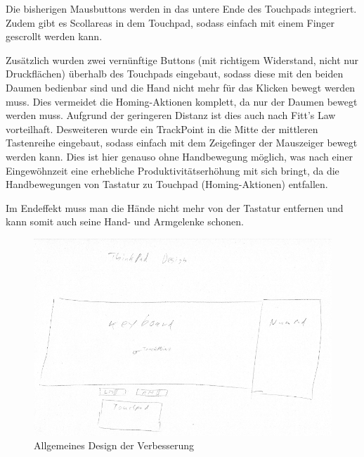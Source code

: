 \documentclass[a4paper,10pt]{scrartcl}
\begin{document}
Die bisherigen Mausbuttons werden in das untere Ende des Touchpads integriert. Zudem gibt es Scollareas in dem Touchpad, sodass einfach mit einem Finger gescrollt werden kann.

Zusätzlich wurden zwei vernünftige Buttons (mit richtigem Widerstand, nicht nur Druckflächen) überhalb des Touchpads eingebaut, sodass diese mit den beiden Daumen bedienbar sind und die Hand nicht mehr für das Klicken bewegt werden muss. Dies vermeidet die Homing-Aktionen komplett, da nur der Daumen bewegt werden muss. Aufgrund der geringeren Distanz ist dies auch nach Fitt's Law vorteilhaft.
Desweiteren wurde ein TrackPoint in die Mitte der mittleren Tastenreihe eingebaut, sodass einfach mit dem Zeigefinger der Mauszeiger bewegt werden kann. Dies ist hier genauso ohne Handbewegung möglich, was nach einer Eingewöhnzeit eine erhebliche Produktivitätserhöhung mit sich bringt, da die Handbewegungen von Tastatur zu Touchpad (Homing-Aktionen) entfallen.

Im Endeffekt muss man die Hände nicht mehr von der Tastatur entfernen und kann somit auch seine Hand- und Armgelenke schonen.

\begin{figure}
	\includegraphics[scale=0.5]{generalDesign_scaled}
	\caption{Allgemeines Design der Verbesserung}
\end{figure}
\end{document}
